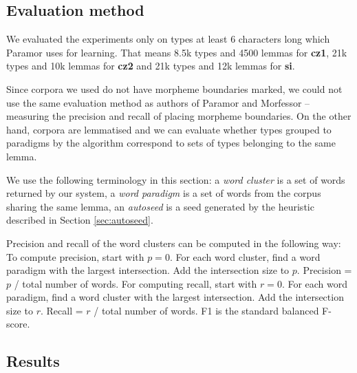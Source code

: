 \documentclass[11pt]{article}
\newcommand{\e}[1]{\textit{#1}} %
\begin{document}
\subsection{Evaluation method}

\noindent
We evaluated the experiments only on types at least 6 characters long which Paramor uses for learning. That means 8.5k types and 4500 lemmas for \textbf{cz1}, 21k types and 10k lemmas for \textbf{cz2} and 21k types and 12k lemmas for \textbf{si}.

Since corpora we used do not have morpheme boundaries marked, we could not use the same evaluation method as authors of Paramor and Morfessor -- measuring the precision and recall of placing morpheme boundaries. On the other hand, corpora are lemmatised and we can evaluate whether types grouped to paradigms by the algorithm correspond to sets of types belonging to the same lemma.

We use the following terminology in this section: a \e{word cluster} is a set of words returned by our system, a \e{word paradigm} is a set of words from the corpus sharing the same lemma, an \e{autoseed} is a seed generated by the heuristic described in Section \ref{sec:autoseed}.

%
Precision and recall of the word clusters can be computed in the following way: To compute precision, start with $p = 0$. For each word cluster, find a word paradigm with the largest intersection. Add the intersection size to $p$. Precision = $p$ / total number of words. For computing recall, start with $r = 0$. For each word paradigm, find a word cluster with the largest intersection. Add the intersection size to $r$. Recall = $r$ / total number of words. F1 is the standard balanced F-score.

\subsection{Results}
\end{document}

